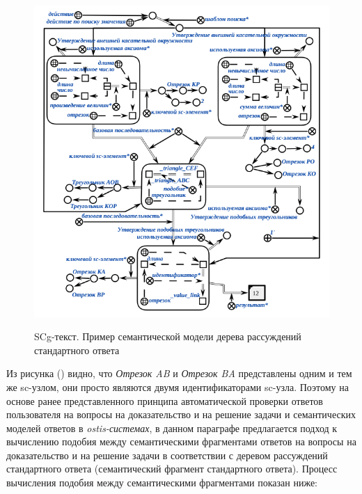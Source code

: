 \begin{figure}[H]
	\caption{SCg-текст. Пример семантической модели дерева рассуждений стандартного ответа}
	\includegraphics[scale=0.6]{author/part7/figures/inference_tree_example_SCg.png}
	\label{fig:ITE_example}
\end{figure}

Из рисунка (\textit{}) видно, что \textit{Отрезок AB} и \textit{Отрезок BA} представлены одним и тем же sc-узлом, они просто являются двумя идентификаторами sc-узла. Поэтому на основе ранее представленного принципа автоматической проверки ответов пользователя на вопросы на доказательство и на решение задачи и семантических моделей ответов в \textit{ostis-системах}, в данном параграфе предлагается подход к вычислению подобия между семантическими фрагментами ответов на вопросы на доказательство и на решение задачи в соответствии с деревом рассуждений стандартного ответа (семантический фрагмент стандартного ответа). Процесс вычисления подобия между семантическими фрагментами показан ниже:

